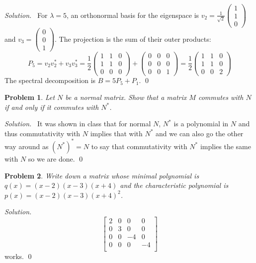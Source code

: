 \documentclass[12pt,a4paper]{article}
\newenvironment{solution}{%
  \par\noindent\textit{Solution.}\ }{\qed}
\theoremstyle{problemstyle}
\newtheorem{problem}{Problem}[section]
\begin{document}
\begin{solution}
For \( \lambda = 5 \), an orthonormal basis for the eigenspace is \( v_2 = \frac{1}{\sqrt{2}}\begin{pmatrix} 1 \\ 1 \\ 0 \end{pmatrix} \) and \( v_3 = \begin{pmatrix} 0 \\ 0 \\ 1 \end{pmatrix} \). The projection is the sum of their outer products:
\[ P_5 = v_2 v_2^* + v_3 v_3^* = \frac{1}{2} \begin{pmatrix} 1 & 1 & 0 \\ 1 & 1 & 0 \\ 0 & 0 & 0 \end{pmatrix} + \begin{pmatrix} 0 & 0 & 0 \\ 0 & 0 & 0 \\ 0 & 0 & 1 \end{pmatrix} = \frac{1}{2} \begin{pmatrix} 1 & 1 & 0 \\ 1 & 1 & 0 \\ 0 & 0 & 2 \end{pmatrix} \]
The spectral decomposition is \( B = 5P_5 + P_1 \).
\end{solution}
\begin{problem}\label{prob:5-6}
Let $N$ be a normal matrix. Show that a matrix $M$ commutes with $N$ if and only if it commutes with $N^*$.
\end{problem}
\begin{solution}
It was shown in class that for normal $N$, $N^*$ is a polynomial in $N$ and thus commutativity with $N$ implies that with $N^*$ and we can also go the other way around as $(N^*)^*=N$ to say that commutativity with $N^*$ implies the same with $N$ so we are done.
\end{solution}
\begin{problem}\label{prob:5-7}
Write down a matrix whose minimal polynomial is $q(x) = (x-2)(x-3)(x+4)$ and the characteristic polynomial is $p(x) = (x-2)(x-3)(x+4)^2$.
\end{problem}
\begin{solution}
\[
    \begin{bmatrix}
		2 & 0 & 0 & 0\\
		0 & 3 & 0 & 0\\
		0 & 0 & -4 & 0\\
		0 & 0 & 0 & -4\\
    \end{bmatrix} 
\]
works.
\end{solution}
\end{document}
